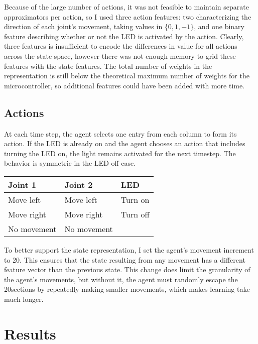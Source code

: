 \documentclass{article}
\begin{document}
Because of the large number of actions, it was not feasible to maintain separate approximators per action, so I used three action features: two characterizing the direction of each joint's movement, taking values in $\{0, 1, -1\}$, and one binary feature describing whether or not the LED is activated by the action. Clearly, three features is insufficient to encode the differences in value for all actions across the state space, however there was not enough memory to grid these features with the state features. The total number of weights in the representation is still below the theoretical maximum number of weights for the microcontroller, so additional features could have been added with more time.


\subsection{Actions}

At each time step, the agent selects one entry from each column to form its action. If the LED is already on and the agent chooses an action that includes turning the LED on, the light remains activated for the next timestep. The behavior is symmetric in the LED off case.

\begin{center}
	\begin{tabular}{ l l l}
		Joint 1 & Joint 2 & LED\\ \midrule
		Move left & Move left & Turn on\\
		Move right & Move right & Turn off\\
		No movement & No movement & 
		
	\end{tabular}
\end{center}

To better support the state representation, I set the agent's movement increment to 20\degree. This ensures that the state resulting from any movement has a different feature vector than the previous state. This change does limit the granularity of the agent's movements, but without it, the agent must randomly escape the 20\degree\space sections by repeatedly making smaller movements, which makes learning take much longer. 



\section{Results}
\end{document}
